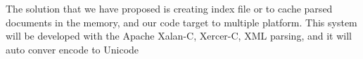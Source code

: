 The solution that we have proposed is creating index file or to cache parsed documents in the memory, and our code target to multiple platform. This system will be developed with the Apache Xalan-C, Xercer-C, XML parsing, and it will auto conver encode to Unicode